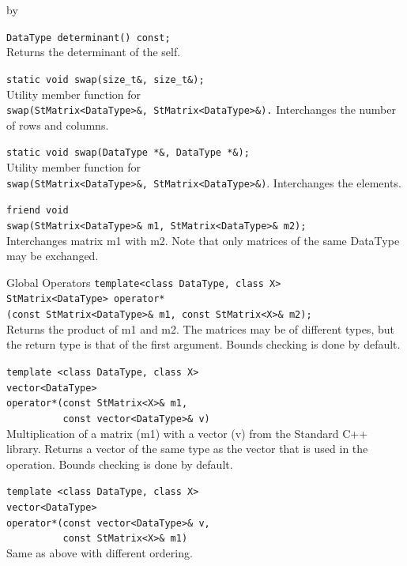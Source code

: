 \documentclass[twoside]{article}
\newcommand{\entrylabel}[1]{\mbox{\textbf{{#1}}}\hfil}%
\newenvironment{entry}
{\begin{list}{}%
    {\renewcommand{\makelabel}{\entrylabel}%
     \setlength{\labelwidth}{90pt}%
     \setlength{\leftmargin}{\labelwidth}
     \advance\leftmargin by \labelsep%
      }%
    }%
  {\end{list}}
\newcommand{\Entrylabel}[1]%
{\raisebox{0pt}[1ex][0pt]{\makebox[\labelwidth][l]%
    {\parbox[t]{\labelwidth}{\hspace{0pt}\textbf{{#1}}}}}}
\newenvironment{Entry}%
{\renewcommand{\entrylabel}{\Entrylabel}\begin{entry}}%
  {\end{entry}}
\begin{document}
\begin{description}
\begin{Entry}
  \verb+DataType determinant() const;+\\
  Returns the determinant of the self.

  \verb+static void swap(size_t&, size_t&);+\\
  Utility member function for \\
  \verb+swap(StMatrix<DataType>&, StMatrix<DataType>&).+
  Interchanges the number of rows and columns.
  
  \verb+static void swap(DataType *&, DataType *&);+\\
  Utility member function for \\
  \verb+swap(StMatrix<DataType>&, StMatrix<DataType>&)+.
  Interchanges the elements.
  
  \verb+friend void+\\
  \verb+swap(StMatrix<DataType>& m1, StMatrix<DataType>& m2);+\\
  Interchanges matrix m1 with m2.  Note that only matrices
  of the same DataType may be exchanged.

\item[Global Operators]
  \verb+template<class DataType, class X>+\\
  \verb+StMatrix<DataType> operator*+\\
  \verb+(const StMatrix<DataType>& m1, const StMatrix<X>& m2);+\\
  Returns the product of m1 and m2.  The matrices may be of different
  types, but the return type is that of the first argument.
  Bounds checking is done by default.
  
  \verb+template <class DataType, class X>+\\
  \verb+vector<DataType>+\\
  \verb+operator*(const StMatrix<X>& m1,+\\
  \verb+          const vector<DataType>& v)+\\
  Multiplication of a matrix (m1) with a vector (v) from the
  Standard C++ library.  Returns a vector of the
  same type as the vector that is used in the operation.
  Bounds checking is done by default.
  
  \verb+template <class DataType, class X>+\\
  \verb+vector<DataType>+\\
  \verb+operator*(const vector<DataType>& v,+\\
  \verb+          const StMatrix<X>& m1)+\\
  Same as above with different ordering.


\end{Entry}
\end{description}
\end{document}
